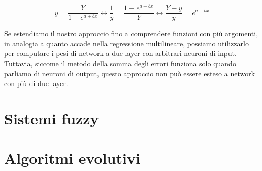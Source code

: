 \documentclass[10pt,a4paper]{article}
\begin{document}
$$
y = \frac{Y}{1 + e^{a+bx}} \leftrightarrow \frac{1}{y} = \frac{1 + e^{a+bx}}{Y} \leftrightarrow \frac{Y - y}{y} = e^{a+bx}
$$

Se estendiamo il nostro approccio fino a comprendere funzioni con più argomenti, in analogia a quanto accade nella regressione multilineare, possiamo utilizzarlo per computare i pesi di network a due layer con arbitrari neuroni di input. Tuttavia, siccome il metodo della somma degli errori funziona solo quando parliamo di neuroni di output, questo approccio non può essere esteso a network con più di due layer.


\section{Sistemi fuzzy}


\section{Algoritmi evolutivi}
\end{document}
